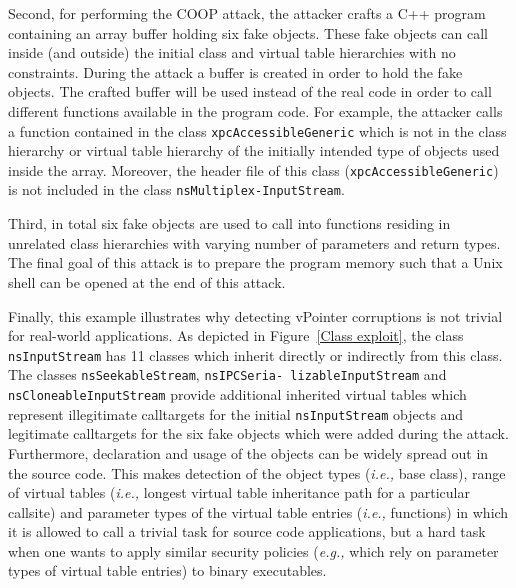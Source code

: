 Second, for performing the COOP attack, the 
attacker crafts a C++ program containing an array buffer holding six fake objects. These fake objects can call inside (and outside) 
the initial class and virtual table hierarchies with no constraints. During the attack a buffer is created in order to hold the 
fake objects. The crafted buffer will be used instead of the real code in order to call different functions available in the program code. 
For example, the attacker calls a function contained in the class \texttt{xpcAccessibleGeneric} which is not in the class 
hierarchy or virtual table hierarchy of the initially intended type of objects used inside the array. Moreover, the header 
file of this class (\texttt{xpcAccessibleGeneric}) is not included in the class \texttt{nsMultiplex-InputStream}. 

Third, in total six fake objects are used to call into functions residing in unrelated class hierarchies with varying number of parameters 
and return types. The final goal of this attack is to prepare the program memory such that a Unix shell can be opened at 
the end of this attack.


Finally, this example illustrates why detecting vPointer corruptions is not trivial for real-world applications. As depicted in 
Figure~\ref{Class exploit}, the class \texttt{nsInputStream} has 11 classes which inherit directly or indirectly from 
this class. The classes \texttt{nsSeekableStream}, \texttt{nsIPCSeria- lizableInputStream} and \texttt{nsCloneableInputStream}
provide additional inherited virtual tables which represent illegitimate calltargets for the initial \texttt{nsInputStream} 
objects and legitimate calltargets for the six fake objects which were added during the attack. Furthermore, declaration and
usage of the objects can be widely spread out in the source code. This makes detection of the object types 
(\textit{i.e.,} base class), range of virtual tables (\textit{i.e.,} longest virtual table inheritance path for a
particular callsite) and parameter types of the virtual table entries (\textit{i.e.,} functions) in which it is 
allowed to call a trivial task for source code applications, but a hard task when one wants to apply similar 
security policies (\textit{e.g.,} which rely on parameter types of virtual table entries) to binary executables.

